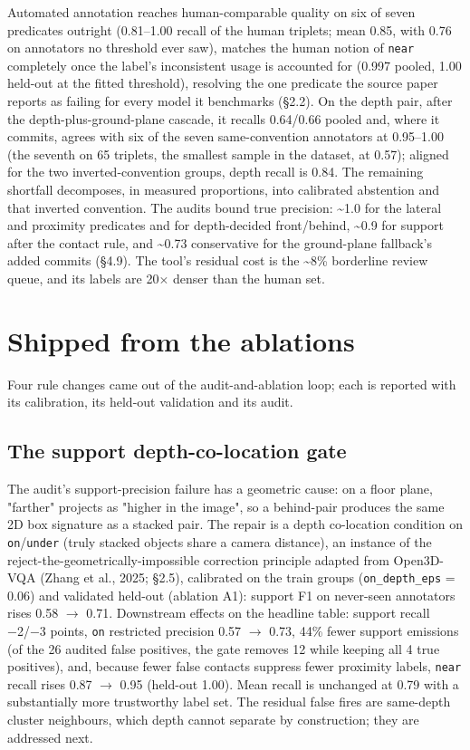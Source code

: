 Automated annotation reaches human-comparable quality on six of seven predicates outright (0.81--1.00 recall of the human triplets; mean 0.85, with 0.76 on annotators no threshold ever saw), matches the human notion of \texttt{near} completely once the label's inconsistent usage is accounted for (0.997 pooled, 1.00 held-out at the fitted threshold), resolving the one predicate the source paper reports as failing for every model it benchmarks (\S2.2). On the depth pair, after the depth-plus-ground-plane cascade, it recalls 0.64/0.66 pooled and, where it commits, agrees with six of the seven same-convention annotators at 0.95--1.00 (the seventh on 65 triplets, the smallest sample in the dataset, at 0.57); aligned for the two inverted-convention groups, depth recall is 0.84. The remaining shortfall decomposes, in measured proportions, into calibrated abstention and that inverted convention. The audits bound true precision: \textasciitilde{}1.0 for the lateral and proximity predicates and for depth-decided front/behind, \textasciitilde{}0.9 for support after the contact rule, and \textasciitilde{}0.73 conservative for the ground-plane fallback's added commits (\S4.9). The tool's residual cost is the \textasciitilde{}8\% borderline review queue, and its labels are 20$\times$ denser than the human set.

\section{Shipped from the ablations}

Four rule changes came out of the audit-and-ablation loop; each is reported with its calibration, its held-out validation and its audit.

\subsection{The support depth-co-location gate}

The audit's support-precision failure has a geometric cause: on a floor plane, "farther" projects as "higher in the image", so a behind-pair produces the same 2D box signature as a stacked pair. The repair is a depth co-location condition on \texttt{on}/\texttt{under} (truly stacked objects share a camera distance), an instance of the reject-the-geometrically-impossible correction principle adapted from Open3D-VQA (Zhang et al., 2025; \S2.5), calibrated on the train groups (\texttt{on\_depth\_eps} = 0.06) and validated held-out (ablation A1): support F1 on never-seen annotators rises 0.58 $\rightarrow$ 0.71. Downstream effects on the headline table: support recall −2/−3 points, \texttt{on} restricted precision 0.57 $\rightarrow$ 0.73, 44\% fewer support emissions (of the 26 audited false positives, the gate removes 12 while keeping all 4 true positives), and, because fewer false contacts suppress fewer proximity labels, \texttt{near} recall rises 0.87 $\rightarrow$ 0.95 (held-out 1.00). Mean recall is unchanged at 0.79 with a substantially more trustworthy label set. The residual false fires are same-depth cluster neighbours, which depth cannot separate by construction; they are addressed next.


